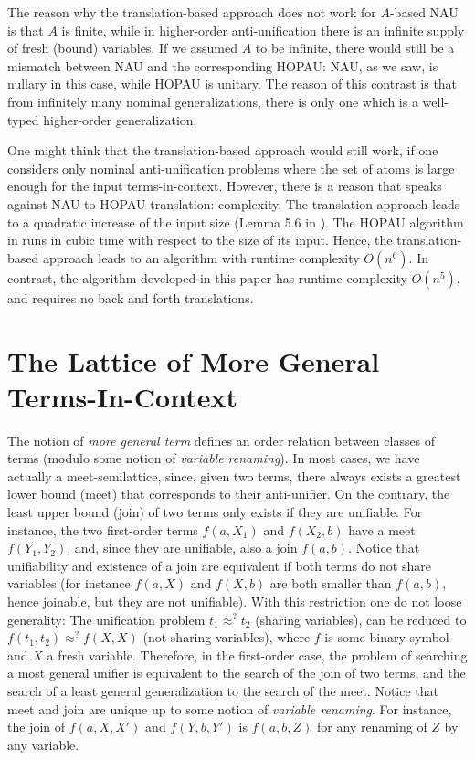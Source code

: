 \documentclass[11pt,a4paper]{amsart}
\theoremstyle{definition}
\begin{document}
The reason why the translation-based approach does not work for
$A$-based NAU is that $A$ is finite, while in higher-order
anti-unification there is an infinite supply of fresh (bound)
variables. 
If we assumed $A$ to be infinite, there would still be a mismatch between
NAU and the corresponding HOPAU: NAU, as we saw, is nullary in this
case, while HOPAU is unitary. The reason of this contrast is that from
infinitely many nominal generalizations, there is only one which is a
well-typed higher-order generalization.



One might think that the translation-based approach would still work,
if one considers only nominal anti-unification problems where the set
of atoms is large enough for the input
terms-in-context.  However, there
is a reason that speaks against NAU-to-HOPAU translation:
complexity. The translation approach leads to a quadratic increase of
the input size (Lemma 5.6 in \cite{DBLP:journals/tocl/LevyV12}). The
HOPAU algorithm in \cite{DBLP:conf/rta/BaumgartnerKLV13} runs in cubic
time  with respect to the size of its
input. Hence, the translation-based approach leads to an algorithm
with runtime complexity $O(n^6)$. In
contrast, the algorithm developed in this paper has runtime complexity
$O(n^5)$, and requires no back and forth
translations.


\section{The Lattice of More General Terms-In-Context}
\label{sect:lattice}

The notion of \emph{more general term} defines an order relation
between classes of terms (modulo some notion of \emph{variable
  renaming}). In most cases, we have actually a meet-semilattice,
since, given two terms, there always exists a greatest lower bound
(meet) that corresponds to their anti-unifier. On the contrary, the
least upper bound (join) of two terms only exists if they are
unifiable. For instance, the two first-order terms $f(a,X_1)$ and
$f(X_2,b)$ have a meet $f(Y_1,Y_2)$, and, since they are unifiable,
also a join $f(a,b)$. Notice that unifiability and existence of a join
are equivalent if both terms do not share variables (for instance
$f(a,X)$ and $f(X,b)$ are both smaller than $f(a,b)$, hence joinable,
but they are not unifiable). With this restriction one do not loose
generality: The unification problem $t_1\approx^? t_2$ (sharing variables),
can be reduced to $f(t_1,t_2) \approx^?  f(X,X)$ (not sharing variables), where $f$
is some binary symbol and $X$ a fresh variable.  Therefore, in the
first-order case, the problem of searching a most general unifier is
equivalent to the search of the join of two terms, and the search of a
least general generalization %
to the search of the meet. Notice that meet
and join are unique up to some notion of \emph{variable renaming}.
For instance, the join of $f(a,X,X')$ and $f(Y,b,Y')$ is $f(a,b,Z)$
for any renaming of $Z$ by any variable.
\end{document}
